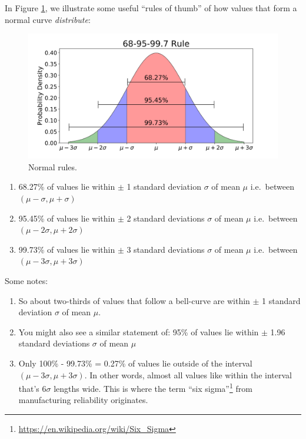 \documentclass[12pt, krantz2,]{krantz}
\providecommand{\tightlist}{%
  \setlength{\itemsep}{0pt}\setlength{\parskip}{0pt}}
\renewcommand{\href}[2]{#2\footnote{\url{#1}}}
\begin{document}
In Figure \ref{fig:normal-rules}, we illustrate some useful ``rules of thumb'' of how values that form a normal curve \emph{distribute}:

\begin{figure}

{\centering \includegraphics[width=0.8\linewidth]{images/normal_curve} 

}

\caption{Normal rules.}\label{fig:normal-rules}
\end{figure}

\begin{enumerate}
\def\labelenumi{\arabic{enumi}.}
\tightlist
\item
  68.27\% of values lie within \(\pm\) 1 standard deviation \(\sigma\) of mean \(\mu\) i.e.~between \((\mu - \sigma, \mu + \sigma)\)
\item
  95.45\% of values lie within \(\pm\) 2 standard deviations \(\sigma\) of mean \(\mu\) i.e.~between \((\mu - 2\sigma, \mu + 2\sigma)\)
\item
  99.73\% of values lie within \(\pm\) 3 standard deviations \(\sigma\) of mean \(\mu\) i.e.~between \((\mu - 3\sigma, \mu + 3\sigma)\)
\end{enumerate}

Some notes:

\begin{enumerate}
\def\labelenumi{\arabic{enumi}.}
\tightlist
\item
  So about two-thirds of values that follow a bell-curve are within \(\pm\) 1 standard deviation \(\sigma\) of mean \(\mu\).
\item
  You might also see a similar statement of: 95\% of values lie within \(\pm\) 1.96 standard deviations \(\sigma\) of mean \(\mu\)
\item
  Only 100\% - 99.73\% = 0.27\% of values lie outside of the interval \((\mu - 3\sigma, \mu + 3\sigma)\). In other words, almost all values like within the interval that's \(6\sigma\) lengths wide. This is where the term \href{https://en.wikipedia.org/wiki/Six_Sigma}{``six sigma''} from manufacturing reliability originates.
\end{enumerate}
\end{document}
